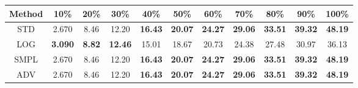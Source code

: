 \documentclass{standalone}
\begin{document}
\begin{tabular}{c|cccccccccc}
      \toprule
      Method & 10\% & 20\% & 30\% & 40\% & 50\% & 60\% & 70\% & 80\% & 90\% & 100\% \\
      \midrule
STD & 2.670 & 8.46 & 12.20 & \textbf{16.43} & \textbf{20.07} & \textbf{24.27} & \textbf{29.06} & \textbf{33.51} & \textbf{39.32} & \textbf{48.19}\\
LOG & \textbf{3.090} & \textbf{8.82} & \textbf{12.46} & 15.01 & 18.67 & 20.73 & 24.38 & 27.48 & 30.97 & 36.13\\
SMPL & 2.670 & 8.46 & 12.20 & \textbf{16.43} & \textbf{20.07} & \textbf{24.27} & \textbf{29.06} & \textbf{33.51} & \textbf{39.32} & \textbf{48.19}\\
ADV & 2.670 & 8.46 & 12.20 & \textbf{16.43} & \textbf{20.07} & \textbf{24.27} & \textbf{29.06} & \textbf{33.51} & \textbf{39.32} & \textbf{48.19}\\
  \bottomrule
\end{tabular}
\end{document}
